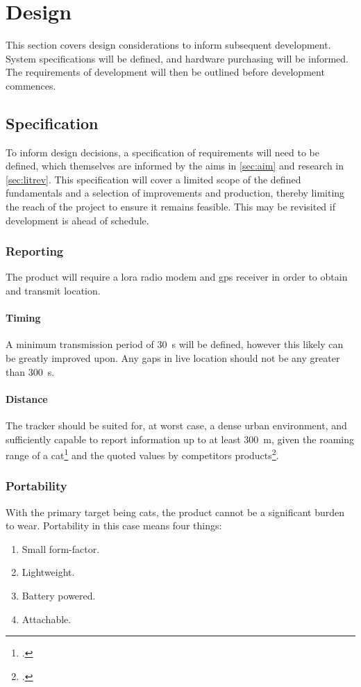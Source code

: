 \section{Design}
This section covers design considerations to inform subsequent development.
System specifications will be defined, and hardware purchasing will be informed.
The requirements of development will then be outlined before development commences. 

\subsection{Specification}
\label{sec:spec}
To inform design decisions, a specification of requirements will need to be 
defined, which themselves are informed by the aims in \cref{sec:aim} 
and research in \cref{sec:litrev}. This specification will cover a limited 
scope of the defined fundamentals and a selection of improvements and production,  
thereby limiting the reach of the project to ensure it remains feasible. 
This may be revisited if development is ahead of schedule. 

\subsubsection{Reporting}
The product will require a \gls{lora} radio modem and \acrshort{gps} receiver in order 
to obtain and transmit location. 

\paragraph{Timing}
\label{sec:timing}
A minimum transmission period of \qty{30}{\s} will be defined, however this 
likely can be greatly improved upon. Any gaps in live location should not be any greater 
than \qty{300}{\second}. 

\paragraph{Distance}
The tracker should be suited for, at worst case, a dense urban environment, 
and sufficiently capable to report information up to at least \qty{300}{\m},
given the roaming range of a cat\footnote{
    .
} and the quoted values by competitors products\footnote{
    .
}.

\subsubsection{Portability}
With the primary target being cats, the product cannot be a significant burden to wear.
Portability in this case means four things:  
\begin{enumerate}
    \item Small form-factor.
    \item Lightweight.
    \item Battery powered.
    \item Attachable.
\end{enumerate}

